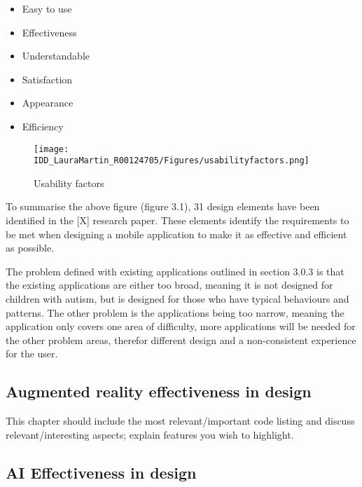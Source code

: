 \begin{itemize}
  \item Easy to use
  \item Effectiveness
  \item Understandable
  \item Satisfaction
  \item Appearance
  \item Efficiency
\end{itemize}

 \begin{figure}[h]
\centering
\texttt{[image: IDD\_LauraMartin\_R00124705/Figures/usabilityfactors.png]}
\caption{Usability factors}
\end{figure}

To summarise the above figure (figure 3.1), 31 design elements have been identified in the [X] research paper. These elements identify the requirements to be met when designing a mobile application to make it as effective and efficient as possible. 

The problem defined with existing applications outlined in section 3.0.3 is that the existing applications are either too broad, meaning it is not designed for children with autism, but is designed for those who have typical behaviours and patterns. The other problem is the applications being too narrow, meaning the application only covers one area of difficulty, more applications will be needed for the other problem areas, therefor different design and a non-consistent experience for the user.


\subsection{Augmented reality effectiveness in design}
This chapter should include the most relevant/important code listing and discuss relevant/interesting aspects; explain features you wish to highlight. 

\subsection{AI Effectiveness in design}


 




